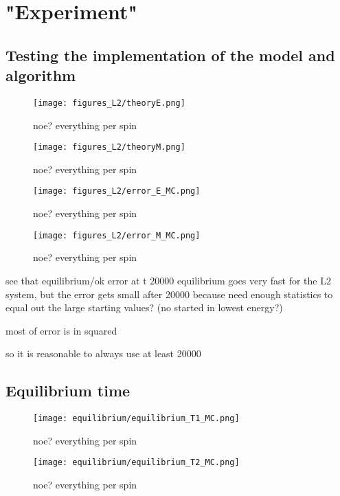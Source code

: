 \documentclass[11pt,a4wide]{article}
\begin{document}
\section{"Experiment"}
\subsection{Testing the implementation of the model and algorithm}

\begin{figure}[htp]
\caption{noe? everything per spin}
\centering
\texttt{[image: figures\_L2/theoryE.png]}
\label{fig:theory E}
\end{figure}

\begin{figure}[htp]
\caption{noe? everything per spin}
\centering
\texttt{[image: figures\_L2/theoryM.png]}
\label{fig:theory M}
\end{figure}

\begin{figure}[htp]
\caption{noe? everything per spin}
\centering
\texttt{[image: figures\_L2/error\_E\_MC.png]}
\label{fig: error E}
\end{figure}

\begin{figure}[htp]
\caption{noe? everything per spin}
\centering
\texttt{[image: figures\_L2/error\_M\_MC.png]}
\label{fig: error M}
\end{figure}

see that equilibrium/ok error at t 20000
equilibrium goes very fast for the L2 system, but the error gets small after 20000 because need enough statistics to equal out the large starting values? (no started in lowest energy?)

most of error is in squared

so it is reasonable to always use at least 20000

\subsection{Equilibrium time}

\begin{figure}[htp]
\caption{noe? everything per spin}
\centering
\texttt{[image: equilibrium/equilibrium\_T1\_MC.png]}
\label{fig: equilibrium T1}
\end{figure}

\begin{figure}[htp]
\caption{noe? everything per spin}
\centering
\texttt{[image: equilibrium/equilibrium\_T2\_MC.png]}
\label{fig: equilibrium T2}
\end{figure}
\end{document}
